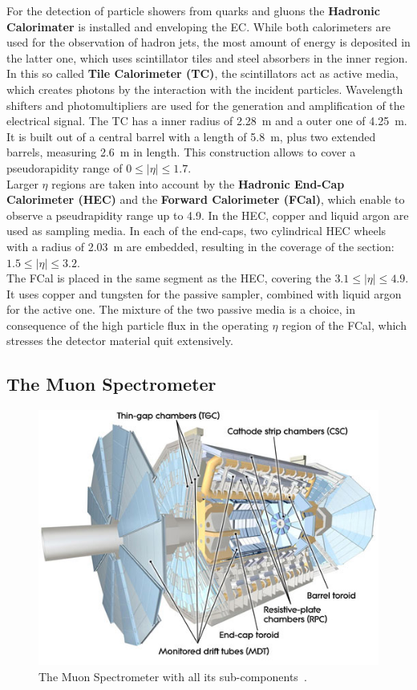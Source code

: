 \noindent For the detection of particle showers from quarks and gluons the \textbf{Hadronic Calorimater} is installed and enveloping the EC. While both calorimeters are used for the observation of hadron jets, the most amount of energy is deposited in the latter one, which uses scintillator tiles and steel absorbers in the inner region. In this so called \textbf{Tile Calorimeter (TC)}, the scintillators act as active media, which creates photons by the interaction with the incident particles. Wavelength shifters and photomultipliers are  used for the generation and amplification of the electrical signal. The TC has a inner radius of 2.28~m and a outer one of 4.25~m. It is built out of a central barrel with a length of 5.8~m, plus two extended barrels, measuring 2.6~m in length. This construction  allows to cover a pseudorapidity range of $0 \leq \mid\eta\mid \leq1.7$.\\

\noindent Larger $\eta$ regions are taken into account by the \textbf{Hadronic End-Cap Calorimeter (HEC)} and the \textbf{Forward Calorimeter (FCal)}, which enable to observe a pseudrapidity range up to 4.9.  In the HEC, copper and liquid argon are used as sampling media. In each of the end-caps, two cylindrical HEC wheels with a radius of 2.03~m are embedded, resulting in the coverage of the section: $1.5 \leq \mid\eta\mid \leq3.2$.\\

\noindent The FCal is placed in the same segment as the HEC, covering the $3.1 \leq \mid\eta\mid \leq 4.9$. It uses copper and tungsten for the passive sampler, combined with liquid argon for the active one. The mixture of the two passive media is a choice, in consequence of the high particle flux in the operating $\eta$ region of the FCal, which stresses the detector material quit extensively.




\subsection{The Muon Spectrometer}\label{MD}

\begin{figure}[h]
	\centering
	\includegraphics[width=0.65\linewidth]{Pics/cp3/36}
	\caption{The Muon Spectrometer with all its sub-components~\cite{Aad:2008zzm}.} 
	\label{fig:36}
\end{figure}

